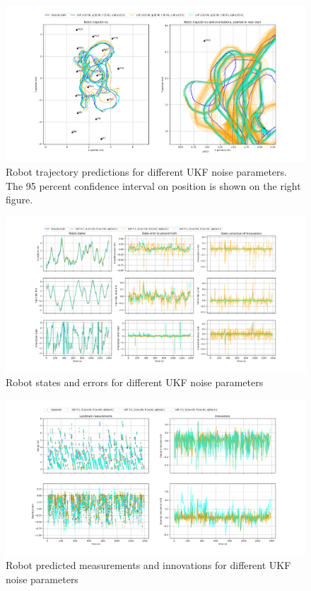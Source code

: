 \documentclass{article}
\begin{document}
\begin{figure}
\centering
\includegraphics[width=\textwidth]{Figure_6.png}
\caption{Robot trajectory predictions for different UKF noise parameters. The 95 percent confidence interval on position is shown on the right figure.}
\end{figure}


\begin{figure}
\centering
\includegraphics[width=\textwidth]{Figure_7.png}
\caption{Robot states and errors for different UKF noise parameters}
\end{figure}

\begin{figure}
\centering
\includegraphics[width=\textwidth]{Figure_8.png}
\caption{Robot predicted measurements and innovations for different UKF noise parameters}
\end{figure}
\end{document}
